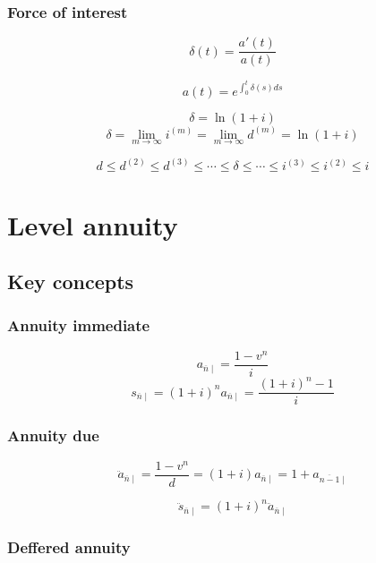 \documentclass[
]{book}
\begin{document}
\hypertarget{force-of-interest}{%
\subsection*{Force of interest}\label{force-of-interest}}

\[\delta(t)=\frac{a'(t)}{a(t)}\]

\[a(t)=e^{\int_0^t\delta(s)ds}\]

\[\delta=\ln(1+i)\]
\[\delta=\lim_{m\rightarrow\infty} i^{(m)}=\lim_{m\rightarrow\infty} d^{(m)}=\ln(1+i)\]

\[d\le d^{(2)}\le d^{(3)}\le\cdots\le \delta\le\cdots\le i^{(3)}\le i^{(2)}\le i\]

\hypertarget{level-annuity}{%
\chapter{Level annuity}\label{level-annuity}}

\hypertarget{key-concepts}{%
\section{Key concepts}\label{key-concepts}}

\hypertarget{annuity-immediate}{%
\subsection*{Annuity immediate}\label{annuity-immediate}}

\[a_{\overline{n}\mid}=\frac{1-v^n}{i}\]
\[s_{\overline{n}\mid}=(1+i)^na_{\overline{n}\mid}=\frac{(1+i)^n-1}{i}\]

\hypertarget{annuity-due}{%
\subsection*{Annuity due}\label{annuity-due}}

\[\ddot{a}_{\overline{n}\mid}=\frac{1-v^n}{d}=(1+i)a_{\overline{n}\mid}=1+a_{\overline{n-1}\mid}\]

\[\ddot{s}_{\overline{n}\mid}=(1+i)^n\ddot{a}_{\overline{n}\mid}\]

\hypertarget{deffered-annuity}{%
\subsection*{Deffered annuity}\label{deffered-annuity}}
\end{document}
